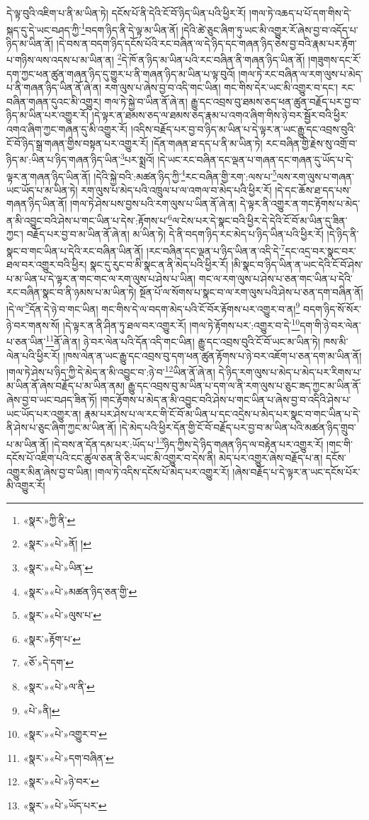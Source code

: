 དེ་ལྟ་བུའི་འཇིག་པ་ནི་མ་ཡིན་ཏེ། དངོས་པོ་ནི་དེའི་ངོ་བོ་ཉིད་ཡིན་པའི་ཕྱིར་རོ། །གལ་ཏེ་འཆད་པ་པོ་དག་གིས་དེ་སྐད་དུ་དེ་ཡང་བཤད་ཀྱི་\footnote{«སྣར་»ཀྱི་ནི་}བདག་ཉིད་ནི་དེ་ལྟ་མ་ཡིན་ནོ། །དེའི་ཚེ་ཅུང་ཞིག་ཏུ་ཡང་མི་འགྱུར་རོ་ཞེས་བྱ་བ་འདོད་པ་ཉིད་མ་ཡིན་ནོ། །དེ་བས་ན་བདག་ཉིད་དངོས་པོའི་རང་བཞིན་ལ་དེ་ཉིད་དང་གཞན་ཉིད་ཅེས་བྱ་བའི་རྣམ་པར་རྟོག་པ་གཉིས་ལས་འདས་པ་མ་ཡིན་ན། \footnote{«སྣར་»«པེ་»ནོ། ། }དེ་ཁོ་ན་ཉིད་མ་ཡིན་པའི་རང་བཞིན་ནི་གཞན་ཉིད་ཡིན་ནོ། །གཟུགས་དང་རོ་དག་ཀྱང་ཕན་ཚུན་གཞན་ཉིད་དུ་གྱུར་པ་ནི་གཞན་ཉིད་མ་ཡིན་པ་ལྟ་བུའོ། །གལ་ཏེ་རང་བཞིན་ལ་རག་ལུས་པ་མེད་པ་ནི་གཞན་ཉིད་ཡིན་ནོ་ཞེ་ན། རག་ལུས་པ་ཞེས་བྱ་བ་འདི་གང་ཡིན། གང་གིས་དེར་ཡང་མི་འགྱུར་བ་དང་། རང་བཞིན་གཞན་དུའང་མི་འགྱུར། གལ་ཏེ་སྐྱེ་བ་ཡིན་ནོ་ཞེ་ན། རྒྱུ་དང་འབྲས་བུ་ཐམས་ཅད་ཕན་ཚུན་བརྗོད་པར་བྱ་བ་ཉིད་མ་ཡིན་པར་འགྱུར་རོ། །དེ་ལྟར་ན་ཐམས་ཅད་ལ་ཐམས་ཅད་རྣམ་པ་འགའ་ཞིག་གིས་ཉེ་བར་སྦྱོར་བའི་ཕྱིར་འགའ་ཞིག་ཀྱང་གཞན་དུ་མི་འགྱུར་རོ། །འདིས་བརྗོད་པར་བྱ་བ་ཉིད་མ་ཡིན་པ་དེ་ལྟར་ན་ཡང་རྒྱུ་དང་འབྲས་བུའི་ངོ་བོ་ཉིད་སྒྲ་གཞན་གྱིས་བསྟན་པར་འགྱུར་རོ། །དོན་གཞན་ཐ་དད་པ་ནི་མ་ཡིན་ཏེ། རང་བཞིན་གྱི་རྗེས་སུ་འགྲོ་བ་ཉིད་མ་:ཡིན་པ་ཉིད་གཞན་ཉིད་ཡིན་\footnote{«སྣར་»«པེ་»ཡིན་}པར་སྨྲའོ། །དེ་ཡང་རང་བཞིན་དང་ལྡན་པ་གཞན་དང་གཞན་དུ་ཡོད་པ་དེ་ལྟར་ན་གཞན་ཉིད་ཡིན་ནོ། །དེའི་སྐྱེ་བའི་:མཚན་ཉིད་ཀྱི་\footnote{«སྣར་»«པེ་»མཚན་ཉིད་ཅན་གྱི་}རང་བཞིན་གྱི་རག་:ལས་པ་\footnote{«སྣར་»«པེ་»ལུས་པ་}ལས་རག་ལུས་པ་གཞན་ཡང་ཡོད་པ་མ་ཡིན་ཏེ། རག་ལུས་པ་མེད་པའི་འཁྲུལ་པ་ལ་འགལ་བ་མེད་པའི་ཕྱིར་རོ། །དེ་དང་ཆོས་ཐ་དད་པས་གཞན་ཉིད་ཡིན་ནོ། །གལ་ཏེ་ཤེས་པས་བྱས་པའི་རག་ལུས་པ་ཡིན་ནོ་ཞེ་ན། དེ་ལྟར་ནི་འགྱུར་ན་གང་རྟོགས་པ་མེད་ན་མི་འབྱུང་བའི་ཤེས་པ་གང་ཡིན་པ་དེས་:རྟོགས་པ་\footnote{«སྣར་»རྟོག་པ་}ལ་ངེས་པར་དེ་སྣང་བའི་ཕྱིར་དེ་དེའི་ངོ་བོ་མ་ཡིན་དུ་ཟིན་ཀྱང་། བརྗོད་པར་བྱ་བ་མ་ཡིན་ནོ་ཞེ་ན། མ་ཡིན་ཏེ། དེ་ནི་བདག་ཉིད་རང་མེད་པ་ཉིད་ཡིན་པའི་ཕྱིར་རོ། །དེ་ཉིད་ནི་སྣང་བ་གང་ཡིན་པ་དེའི་རང་བཞིན་ཡིན་ནོ། །རང་བཞིན་དང་ལྡན་པ་ཉིད་ཡིན་ན་འདི་དེ་\footnote{«ཅོ་»དེ་དག་}དང་འདྲ་བར་སྣང་བར་ཐལ་བར་འགྱུར་བའི་ཕྱིར། སྣང་དུ་རུང་བ་མི་སྣང་ན་ནི་མེད་པའི་ཕྱིར་རོ། །མི་སྣང་བ་ཉིད་ཡིན་ན་ཡང་དེའི་ངོ་བོ་ཤེས་པ་མ་ཡིན་པ་དེ་ལྟར་ན་གང་གང་ལ་རག་ལུས་པ་ཤེས་པ་ཡིན། གང་ལ་རག་ལུས་པ་ཤེས་པ་ཅན་གང་ཡིན་པ་དེའི་རང་བཞིན་སྣང་བ་ནི་ཉམས་པ་མ་ཡིན་ཏེ། སྔོན་པོ་ལ་སོགས་པ་སྣང་བ་ལ་རག་ལུས་པའི་ཤེས་པ་ཅན་དག་བཞིན་ནོ། །དེ་ལ་\footnote{«སྣར་»«པེ་»ལ་ནི་}དོན་དེ་ཉེ་བ་གང་ཡིན། གང་གིས་དེ་ལ་བདག་མེད་པའི་ངོ་བོར་རྟོགས་པར་འགྱུར་བ་ན།\footnote{«པེ་»ནི།} བདག་ཉིད་སོ་སོར་ཉེ་བར་གནས་སོ། །དེ་ལྟར་ན་ནི་ཤིན་ཏུ་ཐལ་བར་འགྱུར་རོ། །གལ་ཏེ་རྟོགས་པར་:འགྱུར་བ་དེ་\footnote{«སྣར་»«པེ་»འགྱུར་བ་}དག་གི་ཉེ་བར་ལེན་པ་ཅན་ཡིན་\footnote{«སྣར་»«པེ་»དག་བཞིན་}ནོ་ཞེ་ན། ཉེ་བར་ལེན་པའི་དོན་འདི་གང་ཡིན། རྒྱུ་དང་འབྲས་བུའི་ངོ་བོ་ཡང་མ་ཡིན་ཏེ། ཁས་མི་ལེན་པའི་ཕྱིར་རོ། །ཁས་ལེན་ན་ཡང་རྒྱུ་དང་འབྲས་བུ་དག་ཕན་ཚུན་རྟོགས་པ་ཉེ་བར་འཇོག་པ་ཅན་དག་མ་ཡིན་ནོ། །གལ་ཏེ་ཤེས་པ་ཉིད་ཀྱི་དེ་མེད་ན་མི་འབྱུང་བ་:ཉེ་བ་\footnote{«སྣར་»«པེ་»ཉེ་བར་}ཡིན་ནོ་ཞེ་ན། དེ་ཉིད་རག་ལུས་པ་མེད་པ་མེད་པར་རིགས་པ་མ་ཡིན་ནོ་ཞེས་བརྗོད་པ་མ་ཡིན་ནམ། རྒྱུ་དང་འབྲས་བུ་མ་ཡིན་པ་དག་ལ་ནི་རག་ལུས་པ་ཅུང་ཟད་ཀྱང་མ་ཡིན་ནོ་ཞེས་བྱ་བ་ཡང་བཤད་ཟིན་ཏོ། །གང་རྟོགས་པ་མེད་ན་མི་འབྱུང་བའི་ཤེས་པ་གང་ཡིན་པ་ཞེས་བྱ་བ་འདིའི་ཤེས་པ་ཡང་ཡོད་པར་འགྱུར་ན། རྣམ་པར་ཤེས་པ་ལ་རང་གི་ངོ་བོ་མ་ཡིན་པ་དང་འདྲེས་པ་མེད་པར་སྣང་བ་གང་ཡིན་པ་དེ་ནི་ཤེས་པ་ཅུང་ཞིག་ཀྱང་མ་ཡིན་ནོ། །དེ་མེད་པའི་ཕྱིར་དོན་གྱི་ངོ་བོ་བརྗོད་པར་བྱ་བ་མ་ཡིན་པའི་མཚན་ཉིད་གྲུབ་པ་མ་ཡིན་ནོ། །དེ་བས་ན་དོན་དམ་པར་:ཡོད་པ་\footnote{«སྣར་»«པེ་»ཡོད་པར་}ཉིད་ཀྱིས་དེ་ཉིད་གཞན་ཉིད་ལ་བརྟེན་པར་འགྱུར་རོ། །གང་གི་དངོས་པོ་འཇིག་པའི་ངང་ཚུལ་ཅན་ནི་ཅིར་ཡང་མི་འགྱུར་བ་དེས་ནི། མེད་པར་འགྱུར་ཞེས་བརྗོད་པ་ན། དངོས་འགྱུར་མིན་ཞེས་བྱ་བ་ཡིན། །གལ་ཏེ་འདིས་དངོས་པོ་མེད་པར་འགྱུར་རོ། །ཞེས་བརྗོད་པ་དེ་ལྟར་ན་ཡང་དངོས་པོར་མི་འགྱུར་རོ། 